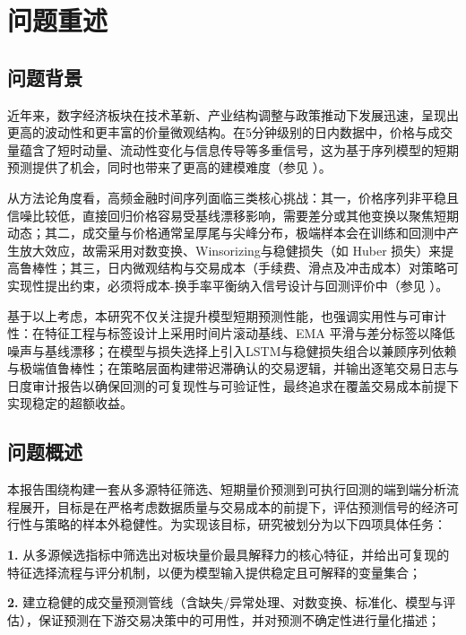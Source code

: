 \documentclass[withoutpreface,bwprint]{cumcmthesis}
\begin{document}
\setcounter{page}{1}
\tableofcontents
{}

\newpage
\setcounter{page}{1}
\section{问题重述}
\subsection{问题背景}

近年来，数字经济板块在技术革新、产业结构调整与政策推动下发展迅速，呈现出更高的波动性和更丰富的价量微观结构。在5分钟级别的日内数据中，价格与成交量蕴含了短时动量、流动性变化与信息传导等多重信号，这为基于序列模型的短期预测提供了机会，同时也带来了更高的建模难度（参见 \cite{cont2001,goodfellow2016}）。

从方法论角度看，高频金融时间序列面临三类核心挑战：其一，价格序列非平稳且信噪比较低，直接回归价格容易受基线漂移影响，需要差分或其他变换以聚焦短期动态；其二，成交量与价格通常呈厚尾与尖峰分布，极端样本会在训练和回测中产生放大效应，故需采用对数变换、Winsorizing与稳健损失（如 Huber 损失）来提高鲁棒性；其三，日内微观结构与交易成本（手续费、滑点及冲击成本）对策略可实现性提出约束，必须将成本-换手率平衡纳入信号设计与回测评价中（参见 \cite{huber1964,almgren2001}）。

基于以上考虑，本研究不仅关注提升模型短期预测性能，也强调实用性与可审计性：在特征工程与标签设计上采用时间片滚动基线、EMA 平滑与差分标签以降低噪声与基线漂移；在模型与损失选择上引入LSTM与稳健损失组合以兼顾序列依赖与极端值鲁棒性；在策略层面构建带迟滞确认的交易逻辑，并输出逐笔交易日志与日度审计报告以确保回测的可复现性与可验证性，最终追求在覆盖交易成本前提下实现稳定的超额收益。

\subsection{问题概述}

本报告围绕构建一套从多源特征筛选、短期量价预测到可执行回测的端到端分析流程展开，目标是在严格考虑数据质量与交易成本的前提下，评估预测信号的经济可行性与策略的样本外稳健性。为实现该目标，研究被划分为以下四项具体任务：

\textbf{1.} 从多源候选指标中筛选出对板块量价最具解释力的核心特征，并给出可复现的特征选择流程与评分机制，以便为模型输入提供稳定且可解释的变量集合；

\textbf{2.} 建立稳健的成交量预测管线（含缺失/异常处理、对数变换、标准化、模型与评估），保证预测在下游交易决策中的可用性，并对预测不确定性进行量化描述；
\end{document}
